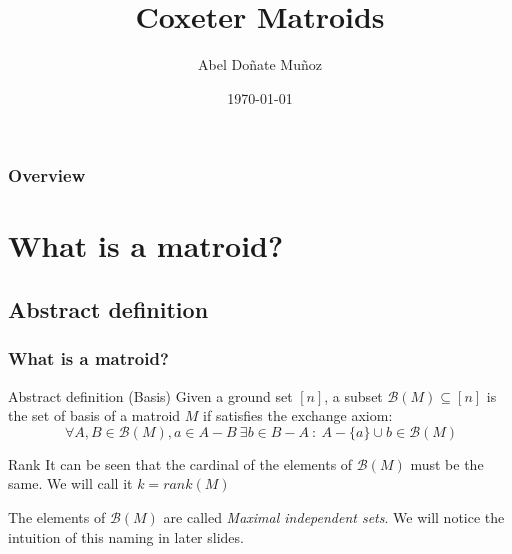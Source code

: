 \documentclass{beamer}
\title{Coxeter Matroids} %
\author{Abel Doñate Muñoz} %
\institute[UPC] %
{
Universitat Politècnica de Catalunya \\ %
\medskip
\textit{abel.donate.munoz@gmail.com} %
}
\date{\today} %
\begin{document}
\begin{frame}
\titlepage %
\end{frame}

\begin{frame}
\frametitle{Overview} %
\tableofcontents %
\end{frame}


\section{What is a matroid?} %

\subsection{Abstract definition}

\begin{frame}
\frametitle{What is a matroid?}
\begin{block}{Abstract definition (Basis)}
  Given a ground set $[n]$, a subset $\mathcal{B}(M)\subseteq [n]$ is the set of basis of a matroid $M$ if satisfies the exchange axiom:
   \[
  \ \forall A, B \in \mathcal{B}(M), a \in A-B \ \exists b\in B-A \ : \ A-\{a\}\cup {b} \in \mathcal{B}(M)
  \] 
\end{block}
\begin{block}{Rank}
It can be seen that the cardinal of the elements of $\mathcal{B}(M)$ must be the same. We will call it $k = rank(M)$
\end{block}

The elements of  $\mathcal{B}(M)$ are called \textit{Maximal independent sets}. We will notice the intuition of this naming in later slides.
\end{frame}
\end{document}

